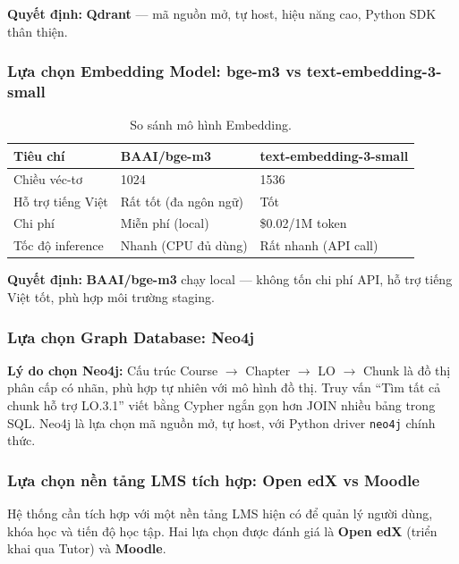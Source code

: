 \noindent\textbf{Quyết định:} \textbf{Qdrant} --- mã nguồn mở, tự host,
hiệu năng cao, Python SDK thân thiện.

\subsubsection{Lựa chọn Embedding Model: bge-m3 vs text-embedding-3-small}

\begin{table}[H]
    \centering
    \caption{So sánh mô hình Embedding.}
    \label{tab:embed-choice}
    \begin{tabular}{p{4cm}p{5cm}p{5.5cm}}
        \toprule
        \textbf{Tiêu chí} & \textbf{BAAI/bge-m3} & \textbf{text-embedding-3-small} \\
        \midrule
        Chiều véc-tơ     & 1024 & 1536 \\
        Hỗ trợ tiếng Việt & Rất tốt (đa ngôn ngữ) & Tốt \\
        Chi phí           & Miễn phí (local) & \$0.02/1M token \\
        Tốc độ inference  & Nhanh (CPU đủ dùng) & Rất nhanh (API call) \\
        \bottomrule
    \end{tabular}
\end{table}

\noindent\textbf{Quyết định:} \textbf{BAAI/bge-m3} chạy local --- không tốn
chi phí API, hỗ trợ tiếng Việt tốt, phù hợp môi trường staging.

\subsubsection{Lựa chọn Graph Database: Neo4j}

\textbf{Lý do chọn Neo4j:} Cấu trúc Course $\to$ Chapter $\to$ LO $\to$ Chunk
là đồ thị phân cấp có nhãn, phù hợp tự nhiên với mô hình đồ thị. Truy vấn
``Tìm tất cả chunk hỗ trợ LO.3.1'' viết bằng Cypher ngắn gọn hơn JOIN nhiều
bảng trong SQL. Neo4j là lựa chọn mã nguồn mở, tự host, với Python driver
\texttt{neo4j} chính thức.

\subsubsection{Lựa chọn nền tảng LMS tích hợp: Open edX vs Moodle}

Hệ thống cần tích hợp với một nền tảng LMS hiện có để quản lý người dùng,
khóa học và tiến độ học tập. Hai lựa chọn được đánh giá là \textbf{Open edX}
(triển khai qua Tutor) và \textbf{Moodle}.


